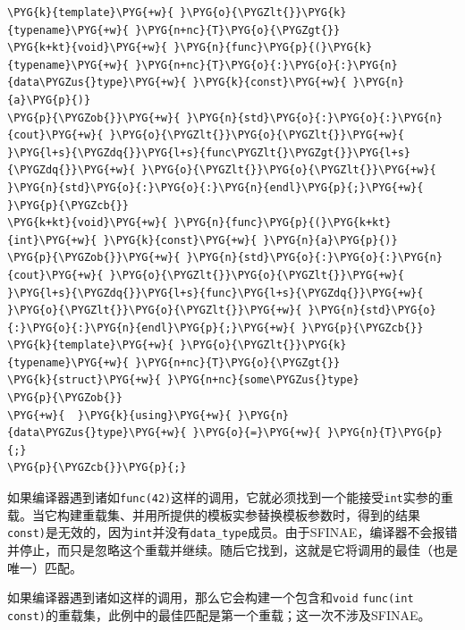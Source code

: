 \begin{codeblockbg}
\begin{Verbatim}[commandchars=\\\{\},breaklines=true,breakanywhere=true,fontsize=\codefont,xleftmargin=17bp]
\PYG{k}{template}\PYG{+w}{ }\PYG{o}{\PYGZlt{}}\PYG{k}{typename}\PYG{+w}{ }\PYG{n+nc}{T}\PYG{o}{\PYGZgt{}}
\PYG{k+kt}{void}\PYG{+w}{ }\PYG{n}{func}\PYG{p}{(}\PYG{k}{typename}\PYG{+w}{ }\PYG{n+nc}{T}\PYG{o}{:}\PYG{o}{:}\PYG{n}{data\PYGZus{}type}\PYG{+w}{ }\PYG{k}{const}\PYG{+w}{ }\PYG{n}{a}\PYG{p}{)}
\PYG{p}{\PYGZob{}}\PYG{+w}{ }\PYG{n}{std}\PYG{o}{:}\PYG{o}{:}\PYG{n}{cout}\PYG{+w}{ }\PYG{o}{\PYGZlt{}}\PYG{o}{\PYGZlt{}}\PYG{+w}{ }\PYG{l+s}{\PYGZdq{}}\PYG{l+s}{func\PYGZlt{}\PYGZgt{}}\PYG{l+s}{\PYGZdq{}}\PYG{+w}{ }\PYG{o}{\PYGZlt{}}\PYG{o}{\PYGZlt{}}\PYG{+w}{ }\PYG{n}{std}\PYG{o}{:}\PYG{o}{:}\PYG{n}{endl}\PYG{p}{;}\PYG{+w}{ }\PYG{p}{\PYGZcb{}}
\PYG{k+kt}{void}\PYG{+w}{ }\PYG{n}{func}\PYG{p}{(}\PYG{k+kt}{int}\PYG{+w}{ }\PYG{k}{const}\PYG{+w}{ }\PYG{n}{a}\PYG{p}{)}
\PYG{p}{\PYGZob{}}\PYG{+w}{ }\PYG{n}{std}\PYG{o}{:}\PYG{o}{:}\PYG{n}{cout}\PYG{+w}{ }\PYG{o}{\PYGZlt{}}\PYG{o}{\PYGZlt{}}\PYG{+w}{ }\PYG{l+s}{\PYGZdq{}}\PYG{l+s}{func}\PYG{l+s}{\PYGZdq{}}\PYG{+w}{ }\PYG{o}{\PYGZlt{}}\PYG{o}{\PYGZlt{}}\PYG{+w}{ }\PYG{n}{std}\PYG{o}{:}\PYG{o}{:}\PYG{n}{endl}\PYG{p}{;}\PYG{+w}{ }\PYG{p}{\PYGZcb{}}
\PYG{k}{template}\PYG{+w}{ }\PYG{o}{\PYGZlt{}}\PYG{k}{typename}\PYG{+w}{ }\PYG{n+nc}{T}\PYG{o}{\PYGZgt{}}
\PYG{k}{struct}\PYG{+w}{ }\PYG{n+nc}{some\PYGZus{}type}
\PYG{p}{\PYGZob{}}
\PYG{+w}{  }\PYG{k}{using}\PYG{+w}{ }\PYG{n}{data\PYGZus{}type}\PYG{+w}{ }\PYG{o}{=}\PYG{+w}{ }\PYG{n}{T}\PYG{p}{;}
\PYG{p}{\PYGZcb{}}\PYG{p}{;}
\end{Verbatim}
\end{codeblockbg}



如果编译器遇到诸如\texttt{func(\allowbreak{}42)}这样的调用，它就必须找到一个能接受\texttt{int}实参的重载。当它构建重载集、并用所提供的模板实参替换模板参数时，得到的结果 \texttt{const)}是无效的，因为\texttt{int}并没有\texttt{data\_\allowbreak{}type}成员。由于SFINAE，编译器不会报错并停止，而只是忽略这个重载并继续。随后它找到，这就是它将调用的最佳（也是唯一）匹配。



如果编译器遇到诸如这样的调用，那么它会构建一个包含和\texttt{void} \texttt{func(\allowbreak{}int const)}的重载集，此例中的最佳匹配是第一个重载；这一次不涉及SFINAE。


